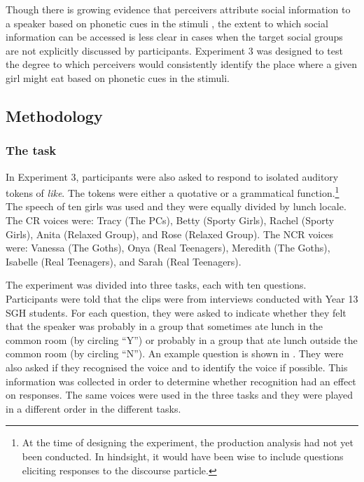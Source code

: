 Though there is growing evidence that perceivers attribute social information to a speaker based on phonetic cues in the stimuli \citep{gilespowesland1975,bayard2000,campbellkibler2007}, the extent to which social information can be accessed is less clear in cases when the target social groups are not explicitly discussed by participants. Experiment 3 was designed to test the degree to which perceivers would consistently identify the place where a given girl might eat based on phonetic cues in the stimuli.

\subsection{Methodology}

\subsubsection{The task}

In Experiment 3, participants were also asked to respond to isolated auditory tokens of \textit{like}. The tokens were either a quotative or a grammatical function.\footnote{At the time of designing the experiment, the production analysis had not yet been conducted. In hindsight, it would have been wise to include questions eliciting responses to the discourse particle.} The speech of ten girls was used and they were equally divided by lunch locale. The CR voices were: Tracy (The PCs), Betty (Sporty Girls), Rachel (Sporty Girls), Anita (Relaxed Group), and Rose (Relaxed Group). The NCR voices were: Vanessa (The Goths), Onya (Real Teenagers), Meredith (The Goths), Isabelle (Real Teenagers), and Sarah (Real Teenagers). 

The experiment was divided into three tasks, each with ten questions. Participants were told that the clips were from interviews conducted with Year 13 SGH students. For each question, they were asked to indicate whether they felt that the speaker was probably in a group that sometimes ate lunch in the common room (by circling ``Y'') or probably in a group that ate lunch outside the common room (by circling ``N''). An example question is shown in .  They were also asked if they recognised the voice and to identify the voice if possible. This information was collected in order to determine whether recognition had an effect on responses. The same voices were used in the three tasks and they were played in a different order in the different tasks. 

